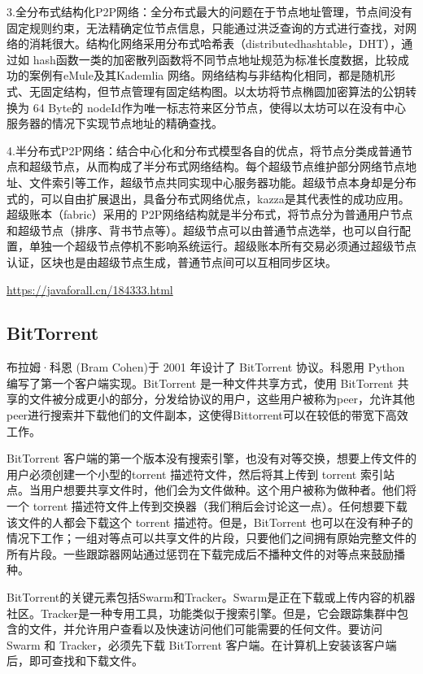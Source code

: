 \documentclass[a4paper,twoside]{scrbook}
\begin{document}
\begin{CJK}{UTF8}{gbsn}
3.全分布式结构化P2P网络：全分布式最大的问题在于节点地址管理，节点间没有固定规则约束，无法精确定位节点信息，只能通过洪泛查询的方式进行查找，对网络的消耗很大。结构化网络采用分布式哈希表（distributedhashtable，DHT），通过如 hash函数一类的加密散列函数将不同节点地址规范为标准长度数据，比较成功的案例有eMule及其Kademlia 网络。网络结构与非结构化相同，都是随机形式、无固定结构，但节点管理有固定结构图。以太坊将节点椭圆加密算法的公钥转换为 64 Byte的 nodeId作为唯一标志符来区分节点，使得以太坊可以在没有中心服务器的情况下实现节点地址的精确查找。

4.半分布式P2P网络：结合中心化和分布式模型各自的优点，将节点分类成普通节点和超级节点，从而构成了半分布式网络结构。每个超级节点维护部分网络节点地址、文件索引等工作，超级节点共同实现中心服务器功能。超级节点本身却是分布式的，可以自由扩展退出，具备分布式网络优点，kazza是其代表性的成功应用。超级账本（fabric）采用的 P2P网络结构就是半分布式，将节点分为普通用户节点和超级节点（排序、背书节点等）。超级节点可以由普通节点选举，也可以自行配置，单独一个超级节点停机不影响系统运行。超级账本所有交易必须通过超级节点认证，区块也是由超级节点生成，普通节点间可以互相同步区块。

\url{https://javaforall.cn/184333.html}
\subsection{BitTorrent}
布拉姆·科恩 (Bram Cohen)于 2001 年设计了 BitTorrent 协议。科恩用 Python 编写了第一个客户端实现。BitTorrent 是一种文件共享方式，使用 BitTorrent 共享的文件被分成更小的部分，分发给协议的用户，这些用户被称为peer，允许其他peer进行搜索并下载他们的文件副本，这使得Bittorrent可以在较低的带宽下高效工作。

BitTorrent 客户端的第一个版本没有搜索引擎，也没有对等交换，想要上传文件的用户必须创建一个小型的torrent 描述符文件，然后将其上传到 torrent 索引站点。当用户想要共享文件时，他们会为文件做种。这个用户被称为做种者。他们将一个 torrent 描述符文件上传到交换器（我们稍后会讨论这一点）。任何想要下载该文件的人都会下载这个 torrent 描述符。但是，BitTorrent 也可以在没有种子的情况下工作；一组对等点可以共享文件的片段，只要他们之间拥有原始完整文件的所有片段。一些跟踪器网站通过惩罚在下载完成后不播种文件的对等点来鼓励播种。

BitTorrent的关键元素包括Swarm和Tracker。Swarm是正在下载或上传内容的机器社区。Tracker是一种专用工具，功能类似于搜索引擎。但是，它会跟踪集群中包含的文件，并允许用户查看以及快速访问他们可能需要的任何文件。要访问 Swarm 和 Tracker，必须先下载 BitTorrent 客户端。在计算机上安装该客户端后，即可查找和下载文件。


\end{CJK}
\end{document}
